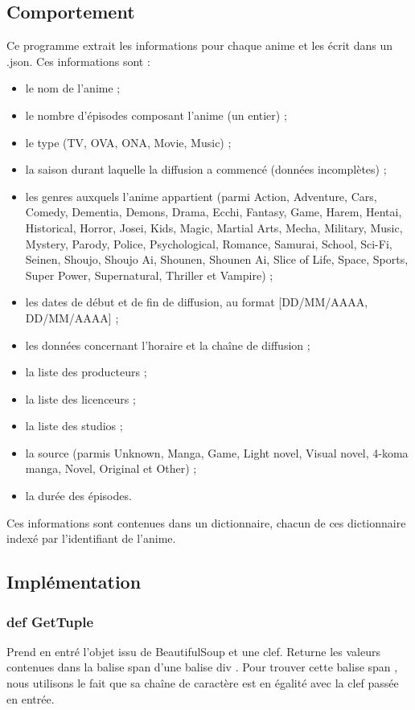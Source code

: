 \documentclass[a4paper,12pt]{article}
\begin{document}
\subsection{Comportement}
Ce programme extrait les informations pour chaque anime et les écrit dans un .json.
Ces informations sont :
\begin{itemize}
\item le nom de l'anime ;
\item le nombre d'épisodes composant l'anime (un entier) ;
\item le type (TV, OVA, ONA, Movie, Music) ;
\item la saison durant laquelle la diffusion a commencé (données incomplètes) ;
\item les genres auxquels l'anime appartient (parmi Action, Adventure, Cars, Comedy, Dementia, Demons, Drama, Ecchi, Fantasy, Game, Harem, Hentai, Historical, Horror, Josei, Kids, Magic, Martial Arts, Mecha, Military, Music, Mystery, Parody, Police, Psychological, Romance, Samurai, School, Sci-Fi, Seinen, Shoujo, Shoujo Ai, Shounen, Shounen Ai, Slice of Life, Space, Sports, Super Power, Supernatural, Thriller et Vampire) ; 
\item les dates de début et de fin de diffusion, au format [DD/MM/AAAA, DD/MM/AAAA] ;
\item les données concernant l'horaire et la chaîne de diffusion ;
\item la liste des producteurs ;
\item la liste des licenceurs ;
\item la liste des studios ;
\item la source (parmis Unknown, Manga, Game, Light novel, Visual novel, 4-koma manga, Novel, Original et Other) ;
\item la durée des épisodes.
\end{itemize}
Ces informations sont contenues dans un dictionnaire, chacun de ces dictionnaire indexé par l'identifiant de l'anime.
\subsection{Implémentation}
\subsubsection{def GetTuple}
Prend en entré l'objet issu de BeautifulSoup et une clef. Returne les valeurs contenues dans la balise \og span \fg{} d'une balise \og div \fg. Pour trouver cette balise \og span \fg, nous utilisons le fait que sa chaîne de caractère est en égalité avec la clef passée en entrée.
\end{document}
